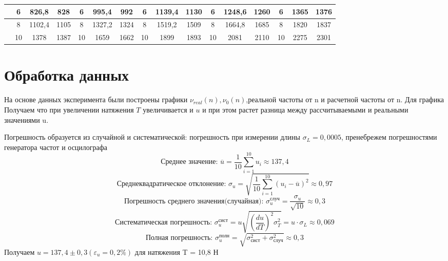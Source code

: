 \documentclass[a4paper]{article}
\begin{document}
\begin{table}[!h]
\begin{tabular}{|c|ccc|ccc|ccc|ccc|ccc|}
                                                         & \multicolumn{1}{c|}{6}  & \multicolumn{1}{c|}{826,8}         & 828              & \multicolumn{1}{c|}{6}  & \multicolumn{1}{c|}{995,4}         & 992              & \multicolumn{1}{c|}{6}  & \multicolumn{1}{c|}{1139,4}        & 1130             & \multicolumn{1}{c|}{6}  & \multicolumn{1}{c|}{1248,6}        & 1260             & \multicolumn{1}{c|}{6}  & \multicolumn{1}{c|}{1365}          & 1376             \\ \hline
                                                         & \multicolumn{1}{c|}{8}  & \multicolumn{1}{c|}{1102,4}        & 1105             & \multicolumn{1}{c|}{8}  & \multicolumn{1}{c|}{1327,2}        & 1324             & \multicolumn{1}{c|}{8}  & \multicolumn{1}{c|}{1519,2}        & 1509             & \multicolumn{1}{c|}{8}  & \multicolumn{1}{c|}{1664,8}        & 1685             & \multicolumn{1}{c|}{8}  & \multicolumn{1}{c|}{1820}          & 1837             \\ \hline
                                                         & \multicolumn{1}{c|}{10} & \multicolumn{1}{c|}{1378}          & 1387             & \multicolumn{1}{c|}{10} & \multicolumn{1}{c|}{1659}          & 1662             & \multicolumn{1}{c|}{10} & \multicolumn{1}{c|}{1899}          & 1893             & \multicolumn{1}{c|}{10} & \multicolumn{1}{c|}{2081}          & 2110             & \multicolumn{1}{c|}{10} & \multicolumn{1}{c|}{2275}          & 2301             \\ \hline
\end{tabular}
\end{table}

\section{Обработка данных}
На основе данных эксперимента были построены графики $\nu_{real}(n), \nu_{0}(n)$,реальной частоты от n и расчетной частоты от n.
Для графика 
Получаем что при увеличении натяжения $T$ увеличивается и $u$ и при этом растет разница между рассчитываемыми и реальными значениями u. 

Погрешность образуется из случайной и систематической: погрешность при измерении длины  $\sigma_{L} = 0,0005$, пренебрежем погрешностями генератора частот и осцилографа
\[\text{Среднее значение:  } \overline{u} = \frac{1}{10}\sum\limits_{i=1}^{10} u_{i} \approx 137,4\]
\[\text{Среднеквадратическое отклонение:  } \sigma_{u} = \sqrt{\frac{1}{10}\sum\limits_{i=1}^{10} (u_{i} - \overline{u})^2} \approx 0,97\]
\[\text{Погрешность среднего значения(случайная):  } \sigma_{u}^{\text{случ}} = \frac{\sigma_{u}}{\sqrt{10}} \approx 0,3\]
\[\text{Систематическая погрешность:  }\sigma_{u}^{\text{сист}} = u\sqrt{\left( \frac{du}{dT}\right)^2 \sigma_{T}^2} = u \cdot \sigma_{L} \approx 0,069\]
\[\text{Полная погрешность:  }\sigma_{u}^{\text{полн}} = \sqrt{\sigma_{\text{сист}}^2 + \sigma_{\text{случ}}^2} \approx 0,3\]
Получаем $u = 137,4 \pm 0,3 (\varepsilon_{u} = 0,2\%)$ для натяжения T = 10,8 Н
\end{document}
